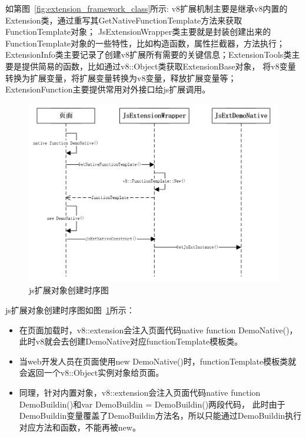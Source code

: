 如第图~\ref{fig:extension_framework_class}所示:
v8扩展机制主要是继承v8内置的Extension类，通过重写其GetNativeFunctionTemplate方法来获取FunctionTemplate对象；
JsExtensionWrapper类主要就是封装创建出来的FunctionTemplate对象的一些特性，比如构造函数，属性拦截器，方法执行；
ExtensionInfo类主要记录了创建v8扩展所有需要的关键信息；ExtensionTools类主要是提供简易的函数，比如通过v8::Object类获取ExtensionBase对象，
将v8变量转换为扩展变量，将扩展变量转换为v8变量，释放扩展变量等；ExtensionFunction主要提供常用对外接口给js扩展调用。

\begin{figure}[H] 
  \centering 
  \includegraphics[width=\textwidth]{image/extension_framework/extension_construct_sequence.png} 
  \caption{js扩展对象创建时序图} \label{fig:extension_construct_sequence} 
\end{figure}

js扩展对象创建时序图如图~\ref{fig:extension_construct_sequence}所示：
\begin{itemize}
  \item 在页面加载时，v8::extension会注入页面代码native function DemoNative()，此时v8就会去创建DemoNative对应functionTemplate模板类。
  \item 当web开发人员在页面使用new DemoNative()时，functionTemplate模板类就会返回一个v8::Object实例对象给页面。
  \item 同理，针对内置对象，v8::extension会注入页面代码native function DemoBuildin()和var DemoBuildin = DemoBuildin()两段代码，
  此时由于DemoBuildin变量覆盖了DemoBuildin方法名，所以只能通过DemoBuildin执行对应方法和函数，不能再被new。
\end{itemize}

